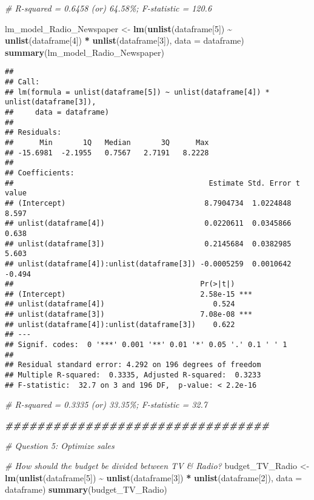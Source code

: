 \documentclass[
]{article}
\newenvironment{Shaded}{\begin{snugshade}}{\end{snugshade}}
\newcommand{\AttributeTok}[1]{\textcolor[rgb]{0.13,0.29,0.53}{#1}}
\newcommand{\CommentTok}[1]{\textcolor[rgb]{0.56,0.35,0.01}{\textit{#1}}}
\newcommand{\DecValTok}[1]{\textcolor[rgb]{0.00,0.00,0.81}{#1}}
\newcommand{\DocumentationTok}[1]{\textcolor[rgb]{0.56,0.35,0.01}{\textbf{\textit{#1}}}}
\newcommand{\FunctionTok}[1]{\textcolor[rgb]{0.13,0.29,0.53}{\textbf{#1}}}
\newcommand{\NormalTok}[1]{#1}
\newcommand{\OtherTok}[1]{\textcolor[rgb]{0.56,0.35,0.01}{#1}}
\newcommand{\SpecialCharTok}[1]{\textcolor[rgb]{0.81,0.36,0.00}{\textbf{#1}}}
\begin{document}
\begin{Shaded}
\begin{Highlighting}[]
\CommentTok{\# R{-}squared = 0.6458 (or) 64.58\%; F{-}statistic = 120.6}

\NormalTok{lm\_model\_Radio\_Newspaper }\OtherTok{\textless{}{-}} \FunctionTok{lm}\NormalTok{(}\FunctionTok{unlist}\NormalTok{(dataframe[}\DecValTok{5}\NormalTok{]) }\SpecialCharTok{\textasciitilde{}} \FunctionTok{unlist}\NormalTok{(dataframe[}\DecValTok{4}\NormalTok{]) }\SpecialCharTok{*} \FunctionTok{unlist}\NormalTok{(dataframe[}\DecValTok{3}\NormalTok{]), }\AttributeTok{data =}\NormalTok{ dataframe)}
\FunctionTok{summary}\NormalTok{(lm\_model\_Radio\_Newspaper)}
\end{Highlighting}
\end{Shaded}

\begin{verbatim}
## 
## Call:
## lm(formula = unlist(dataframe[5]) ~ unlist(dataframe[4]) * unlist(dataframe[3]), 
##     data = dataframe)
## 
## Residuals:
##      Min       1Q   Median       3Q      Max 
## -15.6981  -2.1955   0.7567   2.7191   8.2228 
## 
## Coefficients:
##                                             Estimate Std. Error t value
## (Intercept)                                8.7904734  1.0224848   8.597
## unlist(dataframe[4])                       0.0220611  0.0345866   0.638
## unlist(dataframe[3])                       0.2145684  0.0382985   5.603
## unlist(dataframe[4]):unlist(dataframe[3]) -0.0005259  0.0010642  -0.494
##                                           Pr(>|t|)    
## (Intercept)                               2.58e-15 ***
## unlist(dataframe[4])                         0.524    
## unlist(dataframe[3])                      7.08e-08 ***
## unlist(dataframe[4]):unlist(dataframe[3])    0.622    
## ---
## Signif. codes:  0 '***' 0.001 '**' 0.01 '*' 0.05 '.' 0.1 ' ' 1
## 
## Residual standard error: 4.292 on 196 degrees of freedom
## Multiple R-squared:  0.3335, Adjusted R-squared:  0.3233 
## F-statistic:  32.7 on 3 and 196 DF,  p-value: < 2.2e-16
\end{verbatim}

\begin{Shaded}
\begin{Highlighting}[]
\CommentTok{\# R{-}squared = 0.3335 (or) 33.35\%; F{-}statistic = 32.7}

\DocumentationTok{\#\#\#\#\#\#\#\#\#\#\#\#\#\#\#\#\#\#\#\#\#\#\#\#\#\#\#\#\#\#\#\#\# }

\CommentTok{\# Question 5: Optimize sales}

\CommentTok{\# How should the budget be divided between TV \& Radio? }
\NormalTok{budget\_TV\_Radio }\OtherTok{\textless{}{-}} \FunctionTok{lm}\NormalTok{(}\FunctionTok{unlist}\NormalTok{(dataframe[}\DecValTok{5}\NormalTok{]) }\SpecialCharTok{\textasciitilde{}} \FunctionTok{unlist}\NormalTok{(dataframe[}\DecValTok{3}\NormalTok{]) }\SpecialCharTok{*} \FunctionTok{unlist}\NormalTok{(dataframe[}\DecValTok{2}\NormalTok{]), }\AttributeTok{data =}\NormalTok{ dataframe)}
\FunctionTok{summary}\NormalTok{(budget\_TV\_Radio)}
\end{Highlighting}
\end{Shaded}
\end{document}
